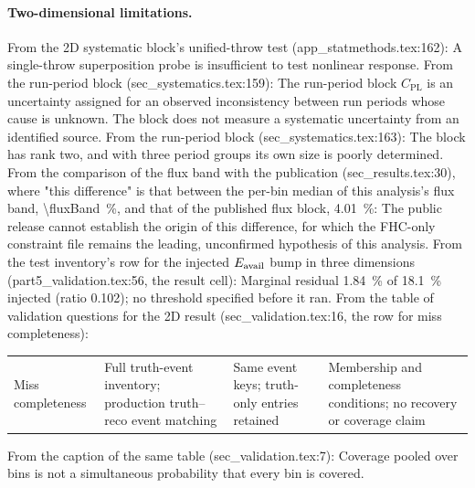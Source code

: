 \paragraph{Two-dimensional limitations.} From the 2D systematic block's unified-throw test (app\_statmethods.tex:162): A single-throw superposition probe is insufficient to test nonlinear response. From the run-period block (sec\_systematics.tex:159): The run-period block $C_{\mathrm{PL}}$ is an uncertainty assigned for an observed inconsistency between run periods whose cause is unknown. The block does not measure a systematic uncertainty from an identified source. From the run-period block (sec\_systematics.tex:163): The block has rank two, and with three period groups its own size is poorly determined. From the comparison of the flux band with the publication (sec\_results.tex:30), where "this difference" is that between the per-bin median of this analysis's flux band, \SI{\fluxBand}{\percent}, and that of the published flux block, \SI{4.01}{\percent}: The public release cannot establish the origin of this difference, for which the FHC-only constraint file remains the leading, unconfirmed hypothesis of this analysis. From the test inventory's row for the injected $E_{\mathrm{avail}}$ bump in three dimensions (part5\_validation.tex:56, the result cell): Marginal residual \SI{1.84}{\percent} of \SI{18.1}{\percent} injected (ratio 0.102); no threshold specified before it ran. From the table of validation questions for the 2D result (sec\_validation.tex:16, the row for miss completeness):
\begin{tabular}{@{}p{}p{}p{}p{}@{}}
Miss completeness & Full truth-event inventory; production truth--reco event matching & Same event keys; truth-only entries retained & Membership and completeness conditions; no recovery or coverage claim \\
\end{tabular}
From the caption of the same table (sec\_validation.tex:7): Coverage pooled over bins is not a simultaneous probability that every bin is covered.


